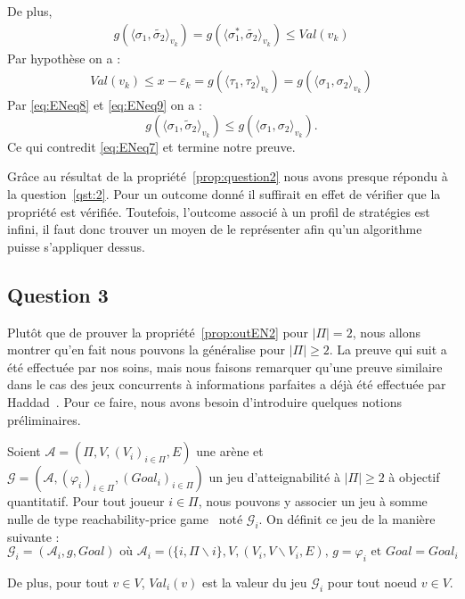 \begin{demonstration}
\begin{itemize}
	De plus, 
	\begin{align}
		g(\langle \sigma_1, \tilde{\sigma_2} \rangle_{v_k}) = g( \langle \sigma_1^*, \tilde{\sigma_2} \rangle_{v_k}) \leq Val(v_k) \label{eq:ENeq8}
	\end{align}
	Par hypothèse on a :
	\begin{align}
		Val(v_k) \leq x - \varepsilon_k = g(\langle \tau_1, \tau_2 \rangle_{v_k} ) = g(\langle \sigma_1, \sigma_2 \rangle_{v_k}) \label{eq:ENeq9}
	\end{align}
	Par \eqref{eq:ENeq8} et \eqref{eq:ENeq9} on a : 
	$$ g(\langle \sigma_1, \tilde{\sigma}_2 \rangle_{v_k}) \leq g( \langle \sigma_1, \sigma_2 \rangle_{v_k}).$$
	Ce qui contredit \eqref{eq:ENeq7} et termine notre preuve.
	\end{itemize}
	
\end{demonstration}

Grâce au résultat de la propriété~\ref{prop:question2} nous avons presque répondu à la question~\ref{qst:2}. Pour un outcome donné il suffirait en effet de vérifier que la propriété est vérifiée. Toutefois, l'outcome associé à un profil de stratégies est infini, il faut donc trouver un moyen de le représenter afin qu'un algorithme puisse s'appliquer dessus.

\subsection{Question 3}
Plutôt que de prouver la propriété~\ref{prop:outEN2} pour $|\Pi|= 2$, nous allons montrer qu'en fait nous pouvons la généralise pour $|\Pi| \geq 2 .$ La preuve qui suit a été effectuée par nos soins, mais nous faisons remarquer qu'une preuve similaire dans le cas des jeux concurrents à informations parfaites a déjà été effectuée par Haddad~\cite{characNashEq}. Pour ce faire, nous avons besoin d'introduire quelques notions préliminaires.


\begin{defi}
	\label{defi:coalGame}
 Soient $\mathcal{A} = (\Pi, V, (V_{i})_{i\in\Pi}, E)$ une arène et $\mathcal{G} = (\mathcal{A}, (\varphi _{i})_{i\in\Pi}, (Goal_{i})_{i\in\Pi})$ un jeu d'atteignabilité à $|\Pi| \geq 2$ à objectif quantitatif.
Pour tout joueur $i \in \Pi$, nous pouvons y associer un jeu à somme nulle de type \og reachability-price game \fg~noté $\mathcal{G}_{i}$.
On définit ce jeu de la manière suivante : 
$$ \displaystyle \mathcal{G}_{i}= (\mathcal{A}_{i}, g , Goal) \text{ où } \mathcal{A}_{i} = (\{i,\Pi\backslash{i}\}, V, (V_{i},V\backslash V_i,E) \text{, } g = \varphi_i \text{ et } Goal = Goal_i$$

\noindent De plus, pour tout $v\in V$, $Val_i(v)$ est la valeur du jeu $\mathcal{G}_i$ pour tout noeud $v\in V$. 
\end{defi} 

